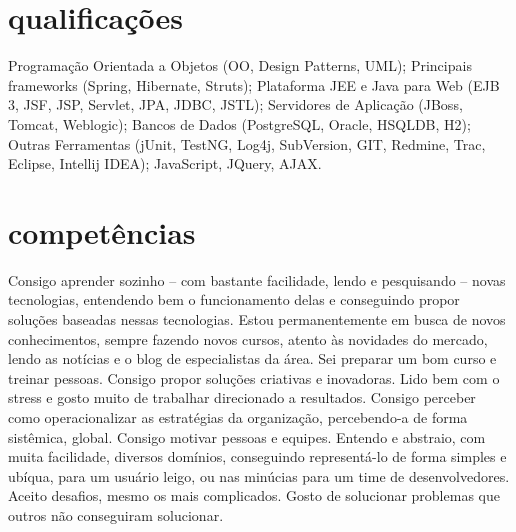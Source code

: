 \newpage

\section{qualificações}

Programação Orientada a Objetos (OO, Design Patterns, UML); Principais frameworks (Spring, Hibernate, Struts); Plataforma JEE e Java para Web (EJB 3, JSF, JSP, Servlet, JPA, JDBC, JSTL); Servidores de Aplicação (JBoss, Tomcat, Weblogic); Bancos de Dados (PostgreSQL, Oracle, HSQLDB, H2); Outras Ferramentas (jUnit, TestNG, Log4j, SubVersion, GIT, Redmine, Trac, Eclipse, Intellij IDEA); JavaScript, JQuery, AJAX.

\section{competências}

Consigo aprender sozinho – com bastante facilidade, lendo e pesquisando – novas tecnologias, entendendo bem o funcionamento delas e conseguindo propor soluções baseadas nessas tecnologias. Estou permanentemente em busca de novos conhecimentos, sempre fazendo novos cursos, atento às novidades do mercado, lendo as notícias e o blog de especialistas da área.
Sei preparar um bom curso e treinar pessoas.
Consigo propor soluções criativas e inovadoras.
Lido bem com o stress e gosto muito de trabalhar direcionado a resultados.
Consigo perceber como operacionalizar as estratégias da organização, percebendo-a de forma sistêmica, global.
Consigo motivar pessoas e equipes.
Entendo e abstraio, com muita facilidade, diversos domínios, conseguindo representá-lo de forma simples e ubíqua, para um usuário leigo, ou nas minúcias para um time de desenvolvedores.
Aceito desafios, mesmo os mais complicados.
Gosto de solucionar problemas que outros não conseguiram solucionar.




